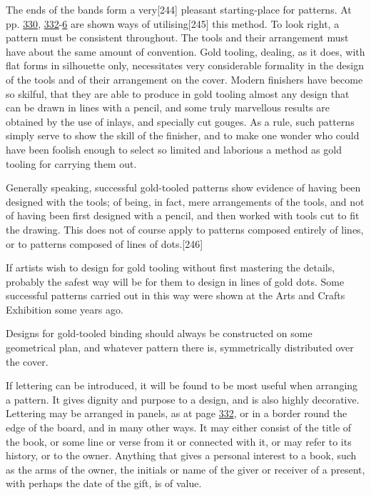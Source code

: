 \documentclass[
]{article}
\begin{document}
The ends of the bands form a
very{\protect\hypertarget{Page_244}{}{{[}244{]}}} pleasant
starting-place for patterns. At pp. \protect\hyperlink{Page_330}{330},
\protect\hyperlink{Page_332}{332}-\protect\hyperlink{Page_336}{6} are
shown ways of utilising{\protect\hypertarget{Page_245}{}{{[}245{]}}}
this method. To look right, a pattern must be consistent throughout. The
tools and their arrangement must have about the same amount of
convention. Gold tooling, dealing, as it does, with flat forms in
silhouette only, necessitates very considerable formality in the design
of the tools and of their arrangement on the cover. Modern finishers
have become so skilful, that they are able to produce in gold tooling
almost any design that can be drawn in lines with a pencil, and some
truly marvellous results are obtained by the use of inlays, and
specially cut gouges. As a rule, such patterns simply serve to show the
skill of the finisher, and to make one wonder who could have been
foolish enough to select so limited and laborious a method as gold
tooling for carrying them out.

Generally speaking, successful gold-tooled patterns show evidence of
having been designed with the tools; of being, in fact, mere
arrangements of the tools, and not of having been first designed with a
pencil, and then worked with tools cut to fit the drawing. This does not
of course apply to patterns composed entirely of lines, or to patterns
composed of lines of dots.{\protect\hypertarget{Page_246}{}{{[}246{]}}}

If artists wish to design for gold tooling without first mastering the
details, probably the safest way will be for them to design in lines of
gold dots. Some successful patterns carried out in this way were shown
at the Arts and Crafts Exhibition some years ago.

Designs for gold-tooled binding should always be constructed on some
geometrical plan, and whatever pattern there is, symmetrically
distributed over the cover.

If lettering can be introduced, it will be found to be most useful when
arranging a pattern. It gives dignity and purpose to a design, and is
also highly decorative. Lettering may be arranged in panels, as at page
\protect\hyperlink{Page_332}{332}, or in a border round the edge of the
board, and in many other ways. It may either consist of the title of the
book, or some line or verse from it or connected with it, or may refer
to its history, or to the owner. Anything that gives a personal interest
to a book, such as the arms of the owner, the initials or name of the
giver or receiver of a present, with perhaps the date of the gift, is of
value.
\end{document}

